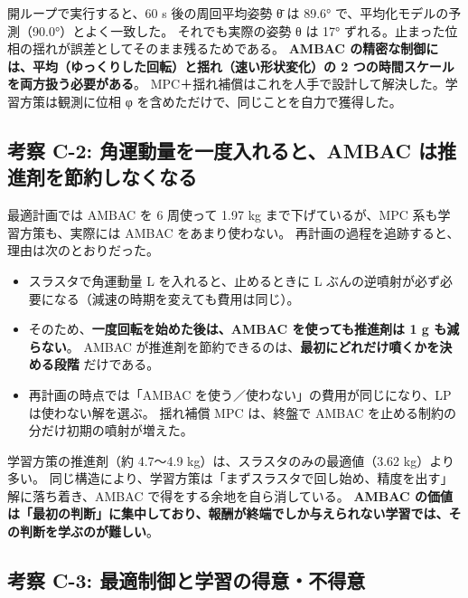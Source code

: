 開ループで実行すると、60 s 後の周回平均姿勢 θ̄ は 89.6° で、平均化モデルの予測（90.0°）とよく一致した。 それでも実際の姿勢 θ は 17° ずれる。止まった位相の揺れが誤差としてそのまま残るためである。 \textbf{AMBAC の精密な制御には、平均（ゆっくりした回転）と揺れ（速い形状変化）の 2 つの時間スケールを両方扱う必要がある}。 MPC＋揺れ補償はこれを人手で設計して解決した。学習方策は観測に位相 φ を含めただけで、同じことを自力で獲得した。

\subsection{考察 C-2: 角運動量を一度入れると、AMBAC は推進剤を節約しなくなる}

最適計画では AMBAC を 6 周使って 1.97 kg まで下げているが、MPC 系も学習方策も、実際には AMBAC をあまり使わない。 再計画の過程を追跡すると、理由は次のとおりだった。

\begin{itemize}
\tightlist
\item
  スラスタで角運動量 L を入れると、止めるときに \textbar L\textbar{} ぶんの逆噴射が必ず必要になる（減速の時期を変えても費用は同じ）。
\item
  そのため、\textbf{一度回転を始めた後は、AMBAC を使っても推進剤は 1 g も減らない}。 AMBAC が推進剤を節約できるのは、\textbf{最初にどれだけ噴くかを決める段階} だけである。
\item
  再計画の時点では「AMBAC を使う／使わない」の費用が同じになり、LP は使わない解を選ぶ。 揺れ補償 MPC は、終盤で AMBAC を止める制約の分だけ初期の噴射が増えた。
\end{itemize}

学習方策の推進剤（約 4.7〜4.9 kg）は、スラスタのみの最適値（3.62 kg）より多い。 同じ構造により、学習方策は「まずスラスタで回し始め、精度を出す」解に落ち着き、AMBAC で得をする余地を自ら消している。 \textbf{AMBAC の価値は「最初の判断」に集中しており、報酬が終端でしか与えられない学習では、その判断を学ぶのが難しい}。

\subsection{考察 C-3: 最適制御と学習の得意・不得意}

